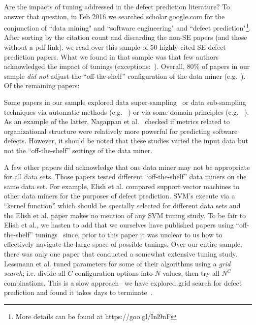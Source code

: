 Are the impacts of tuning addressed in the defect prediction literature?
To answer that question,  in Feb 2016 we searched scholar.google.com for the conjunction of ``data mining" and ``software engineering" and  ``defect prediction"\footnote{More details can be found at https://goo.gl/Inl9nF}.
After sorting by the citation count and discarding the non-SE papers (and those without a pdf link), we read over this sample
of  50 highly-cited SE defect prediction papers. 
What we found in that sample was that few authors
acknowledged the impact of tunings (exceptions:~\cite{Gao:2011,lessmann2008benchmarking}).
Overall,  80\% of papers in our sample {\em did not} adjust
the ``off-the-shelf'' configuration of the data miner (e.g.~\cite{me07b,Moser:2008,Elish2008649}). Of the remaining papers:
\bi
\item
Some papers in our sample  explored   data super-sampling~\cite{4271036} or data sub-sampling techniques via  automatic methods (e.g. ~\cite{Gao:2011,me07b,4271036,Kim:2011}) 
or via some domain principles (e.g. ~\cite{Moser:2008,Nagappan:2008,Hassan:2009}).
As an example of the latter, Nagappan et al.~\cite{Nagappan:2008} checked if metrics related to organizational structure were relatively more powerful for predicting software defects. 
However, it should be noted that  these studies varied the input data but
not the   ``off-the-shelf''   settings of the data miner.
\item
A few other papers did acknowledge that one data miner may not be appropriate
for all data sets.  Those papers tested  different  
``off-the-shelf'' data miners on the same data set.
For example, Elish et al.\cite{Elish2008649}  compared support vector
machines to other data miners for the purposes of defect prediction. SVM's execute via a ``kernel function'' which should be specially selected for different data sets and
the Elish et al. paper  makes no mention of any SVM tuning study.  
To be fair to Elish et al., we hasten to add that we
ourselves have  published
papers using ``off-the-shelf'' tunings~\cite{me07b} since,
prior to this paper it was unclear to us how to effectively
navigate the large space of possible tunings.
\ei
Over our entire sample, there was only  one paper that conducted a somewhat extensive tuning study.
Lessmann et al.\cite{lessmann2008benchmarking} tuned parameters for some of their algorithms using  a {\em grid search}; i.e. divide all $C$ configuration
options into $N$ values, then try all   $N^C$ combinations.
This is a slow approach-- we have explored grid search for 
defect prediction and found it takes days to terminate~\cite{me07b}.
